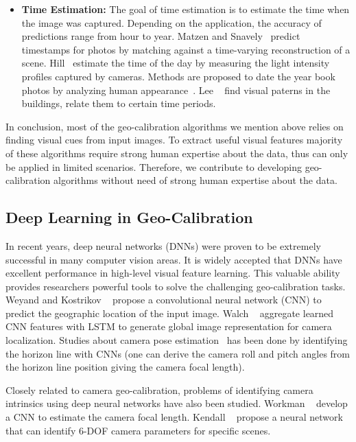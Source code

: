 \begin{itemize}[noitemsep]
\item \textbf{Time Estimation:}
The goal of time estimation is to estimate the time when the 
image was captured. Depending on the application, the accuracy of
predictions range from hour to year.
%
Matzen and Snavely~\cite{matzen2014scene} predict
timestamps for photos by matching against a time-varying
reconstruction of a scene.  Hill~\cite{hill1994elephant} estimate the
time of the day by measuring the light intensity profiles captured by
cameras. Methods are proposed to date the
year book photos by analyzing human
appearance~\cite{salem2016face2year,ginosar2015century}. Lee
\etal~\cite{linking2015iccp} find visual paterns in the buildings,
relate them to certain time periods.
\newline

\end{itemize}

In conclusion, most of the geo-calibration algorithms we mention above
relies on finding visual cues from input images. To extract useful
visual features majority of these algorithms require strong human
expertise about the data, thus can only be applied in limited
scenarios. Therefore, we contribute to developing geo-calibration
algorithms without need of strong human expertise about the data.

\subsection{Deep Learning in Geo-Calibration}
In recent years, deep neural networks (DNNs) were proven to be
extremely successful in many computer vision areas. 
It is widely accepted that DNNs have excellent performance in
high-level visual feature learning.
This valuable ability provides researchers powerful tools to
solve the challenging geo-calibration tasks.
Weyand and Kostrikov \etal~\cite{planet} propose a convolutional
neural network (CNN) to predict the geographic location of the input
image. Walch \etal~\cite{walch2017image} aggregate learned CNN
features with LSTM to generate global image representation for camera
localization.  Studies about camera pose
estimation~\cite{zhai2016horizon, workman2016horizon,
hold2017perceptual} has been done by identifying the horizon line with
CNNs (one can derive the camera roll and pitch angles from the horizon
line position giving the camera focal length).

Closely related to camera geo-calibration, problems of identifying
camera intrinsics using deep neural networks have also been studied.
Workman \etal~\cite{workman2015deepfocal} develop a CNN to estimate
the camera focal length. Kendall \etal~\cite{kendall2015convolutional}
propose a neural network that can identify 6-DOF camera parameters for
specific scenes.

